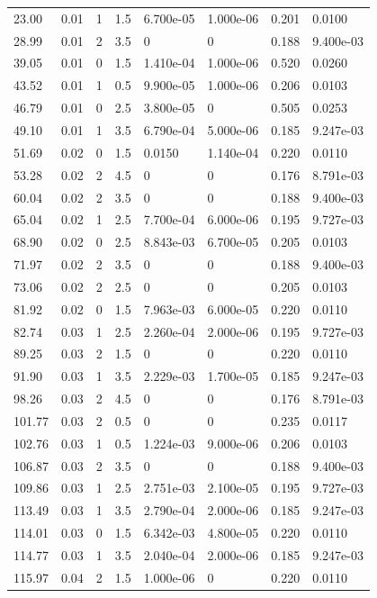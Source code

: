 \documentclass[preview]{standalone}
\begin{document}
{{\begin{tabular}{L{1.2cm}C{1.2cm} C{0.3cm}C{0.5cm} C{1.4cm}C{1.4cm} C{1.4cm}C{1.4cm}}
  23.00  &  0.01  & 1     & 1.5 &  6.700e-05  & 1.000e-06  & 0.201 &  0.0100   \\ 
  28.99  &  0.01  & 2     & 3.5 &  0  & 0  & 0.188 &  9.400e-03   \\ 
  39.05  &  0.01  & 0     & 1.5 &  1.410e-04  & 1.000e-06  & 0.520 &  0.0260   \\ 
  43.52  &  0.01  & 1     & 0.5 &  9.900e-05  & 1.000e-06  & 0.206 &  0.0103   \\ 
  46.79  &  0.01  & 0     & 2.5 &  3.800e-05  & 0  & 0.505 &  0.0253   \\ 
  49.10  &  0.01  & 1     & 3.5 &  6.790e-04  & 5.000e-06  & 0.185 &  9.247e-03   \\ 
  51.69  &  0.02  & 0     & 1.5 &  0.0150  & 1.140e-04  & 0.220 &  0.0110   \\ 
  53.28  &  0.02  & 2     & 4.5 &  0  & 0  & 0.176 &  8.791e-03   \\ 
  60.04  &  0.02  & 2     & 3.5 &  0  & 0  & 0.188 &  9.400e-03   \\ 
  65.04  &  0.02  & 1     & 2.5 &  7.700e-04  & 6.000e-06  & 0.195 &  9.727e-03   \\ 
  68.90  &  0.02  & 0     & 2.5 &  8.843e-03  & 6.700e-05  & 0.205 &  0.0103   \\ 
  71.97  &  0.02  & 2     & 3.5 &  0  & 0  & 0.188 &  9.400e-03   \\ 
  73.06  &  0.02  & 2     & 2.5 &  0  & 0  & 0.205 &  0.0103   \\ 
  81.92  &  0.02  & 0     & 1.5 &  7.963e-03  & 6.000e-05  & 0.220 &  0.0110   \\ 
  82.74  &  0.03  & 1     & 2.5 &  2.260e-04  & 2.000e-06  & 0.195 &  9.727e-03   \\ 
  89.25  &  0.03  & 2     & 1.5 &  0  & 0  & 0.220 &  0.0110   \\ 
  91.90  &  0.03  & 1     & 3.5 &  2.229e-03  & 1.700e-05  & 0.185 &  9.247e-03   \\ 
  98.26  &  0.03  & 2     & 4.5 &  0  & 0  & 0.176 &  8.791e-03   \\ 
  101.77  &  0.03  & 2     & 0.5 &  0  & 0  & 0.235 &  0.0117   \\ 
  102.76  &  0.03  & 1     & 0.5 &  1.224e-03  & 9.000e-06  & 0.206 &  0.0103   \\ 
  106.87  &  0.03  & 2     & 3.5 &  0  & 0  & 0.188 &  9.400e-03   \\ 
  109.86  &  0.03  & 1     & 2.5 &  2.751e-03  & 2.100e-05  & 0.195 &  9.727e-03   \\ 
  113.49  &  0.03  & 1     & 3.5 &  2.790e-04  & 2.000e-06  & 0.185 &  9.247e-03   \\ 
  114.01  &  0.03  & 0     & 1.5 &  6.342e-03  & 4.800e-05  & 0.220 &  0.0110   \\ 
  114.77  &  0.03  & 1     & 3.5 &  2.040e-04  & 2.000e-06  & 0.185 &  9.247e-03   \\ 
  115.97  &  0.04  & 2     & 1.5 &  1.000e-06  & 0  & 0.220 &  0.0110   \\ 
\hline 
\end{tabular} 

}}
\end{document}

